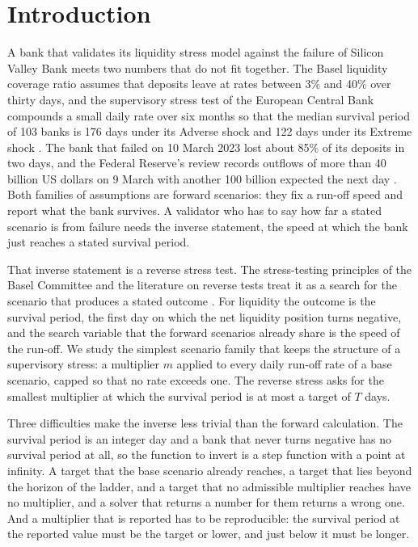\section{Introduction}
\label{sec:introduction}

A bank that validates its liquidity stress model against the failure of Silicon Valley Bank meets two numbers that do not fit together. The Basel liquidity coverage ratio assumes that deposits leave at rates between 3\% and 40\% over thirty days, and the supervisory stress test of the European Central Bank compounds a small daily rate over six months so that the median survival period of 103 banks is 176 days under its Adverse shock and 122 days under its Extreme shock \citep{bcbs238,ecblist2019,ecbannex2019}. The bank that failed on 10 March 2023 lost about 85\% of its deposits in two days, and the Federal Reserve's review records outflows of more than 40 billion US dollars on 9 March with another 100 billion expected the next day \citep{bcbs555,fedsvb2023}. Both families of assumptions are forward scenarios: they fix a run-off speed and report what the bank survives. A validator who has to say how far a stated scenario is from failure needs the inverse statement, the speed at which the bank just reaches a stated survival period.

That inverse statement is a reverse stress test. The stress-testing principles of the Basel Committee and the literature on reverse tests treat it as a search for the scenario that produces a stated outcome \citep{bcbs155,glasserman2015,breuercsiszar2013,grundke2018}. For liquidity the outcome is the survival period, the first day on which the net liquidity position turns negative, and the search variable that the forward scenarios already share is the speed of the run-off. We study the simplest scenario family that keeps the structure of a supervisory stress: a multiplier $m$ applied to every daily run-off rate of a base scenario, capped so that no rate exceeds one. The reverse stress asks for the smallest multiplier at which the survival period is at most a target of $T$ days.

Three difficulties make the inverse less trivial than the forward calculation. The survival period is an integer day and a bank that never turns negative has no survival period at all, so the function to invert is a step function with a point at infinity. A target that the base scenario already reaches, a target that lies beyond the horizon of the ladder, and a target that no admissible multiplier reaches have no multiplier, and a solver that returns a number for them returns a wrong one. And a multiplier that is reported has to be reproducible: the survival period at the reported value must be the target or lower, and just below it must be longer.

